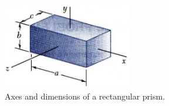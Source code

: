

\begin{figure}[h]
    \centering
    \includegraphics[width=0.5\textwidth]{figures/hardware_design/rect_inertia.png}
    \caption{Axes and dimensions of a rectangular prism.}
    \label{fig:rect_inertia}
\end{figure}

